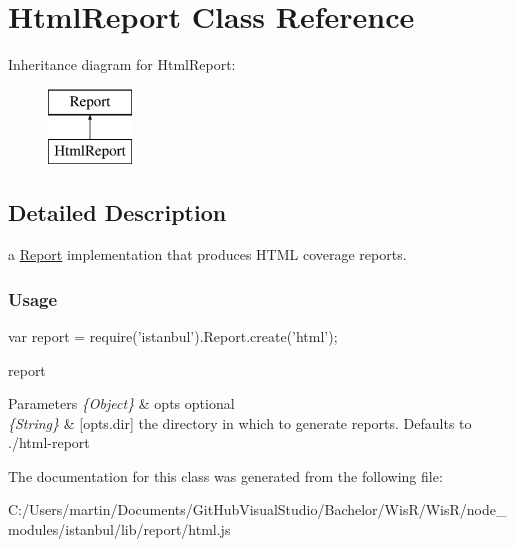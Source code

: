 \hypertarget{class_html_report}{}\section{Html\+Report Class Reference}
\label{class_html_report}
Inheritance diagram for Html\+Report\+:\begin{figure}[H]
\begin{center}
\leavevmode
\includegraphics[height=2.000000cm]{class_html_report}
\end{center}
\end{figure}


\subsection{Detailed Description}
a {\ttfamily \hyperlink{class_report}{Report}} implementation that produces H\+T\+M\+L coverage reports.

\subsubsection*{Usage }

\begin{DoxyVerb} var report = require('istanbul').Report.create('html');
\end{DoxyVerb}


report  
\begin{DoxyParams}{Parameters}
{\em \{\+Object\}} & opts optional \\
\hline
{\em \{\+String\}} & \mbox{[}opts.\+dir\mbox{]} the directory in which to generate reports. Defaults to {\ttfamily ./html-\/report} \\
\hline
\end{DoxyParams}


The documentation for this class was generated from the following file\+:\begin{DoxyCompactItemize}
\item 
C\+:/\+Users/martin/\+Documents/\+Git\+Hub\+Visual\+Studio/\+Bachelor/\+Wis\+R/\+Wis\+R/node\+\_\+modules/istanbul/lib/report/html.\+js\end{DoxyCompactItemize}

